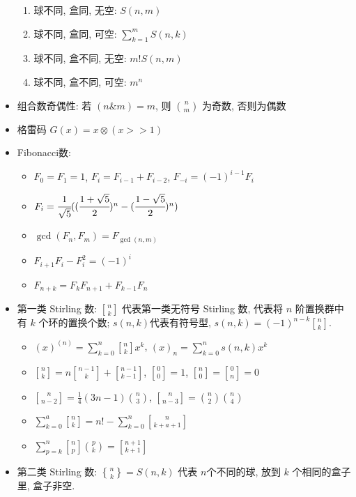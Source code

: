 \documentclass[landscape, twocolumn, 8pt, a4paper, twoside]{extarticle}
\newcommand{\stlf}[2]{\genfrac{ [ }{ ] }{0pt}{}{#1}{#2}}
\newcommand{\stls}[2]{\genfrac{ \{ }{ \} }{0pt}{}{#1}{#2}}
\begin{document}
\begin{itemize}
\begin{enumerate}
    \item 球不同, 盒同, 无空: $S(n, m)$
    \item 球不同, 盒同, 可空: $\sum_{k = 1}^{m} S(n, k)$
    \item 球不同, 盒不同, 无空: $m! S(n, m)$
    \item 球不同, 盒不同, 可空: $m^n$
    \end{enumerate}
  \item 组合数奇偶性: 若 $(n \& m) = m$, 则 $\binom{n}{m}$ 为奇数, 否则为偶数
  \item 格雷码 $G(x) = x \otimes (x >> 1) $
  \item Fibonacci数: 
    \begin{itemize}
    \item $F_0 = F_1 = 1$, $F_i = F_{i - 1} + F_{i - 2}$, $F_{-i} = (-1) ^ {i - 1} F_i$
    \item $F_i = \cfrac{1}{\sqrt{5}} ((\cfrac{1 + \sqrt{5}}{2}) ^ n - (\cfrac{1 - \sqrt{5}}{2}) ^ {n}) $
    \item $\gcd(F_n,F_m)=F_{\gcd(n,m)}$
    \item $F_{i + 1} F_i - F_i^2 = (-1) ^ i$
    \item $F_{n + k} = F_k F_{n + 1} + F_{k - 1} F_n$
    \end{itemize}
  \item 第一类 Stirling 数: $\stlf{n}{k}$ 代表第一类无符号 Stirling 数, 代表将 $n$ 阶置换群中有 $k$ 个环的置换个数; $s(n,k)$代表有符号型, $s(n, k) = (-1)^{n - k}\stlf{n}{k}$.
    \begin{itemize}
    \item $(x)^{(n)} = \sum\limits_{k = 0}^{n}\stlf{n}{k}x ^k$, $(x)_{n} = \sum\limits_{k = 0}^{n} s(n, k) x ^k$
    \item $\stlf{n}{k} = n\stlf{n - 1}{k} + \stlf{n - 1}{k - 1}$, $\stlf{0}{0} = 1$, $\stlf{n}{0} = \stlf{0}{n} = 0$
    \item $\stlf{n}{n - 2} = \frac{1}{4} (3n - 1) \binom{n}{3} $, $\stlf{n}{n - 3} = \binom{n}{2} \binom{n}{4} $
    \item $\sum\limits_{k = 0}^{a}\stlf{n}{k} = n! - \sum\limits_{k = 0}^{n} \stlf{n}{k + a + 1}$
    \item $\sum\limits_{p = k}^{n}\stlf{n}{p}\binom{p}{k} = \stlf{n + 1}{k + 1}$
    \end{itemize}
  \item 第二类 Stirling 数: $\stls{n}{k} = S(n, k)$ 代表 $n$个不同的球, 放到 $k$ 个相同的盒子里, 盒子非空.

\end{itemize}
\end{document}
